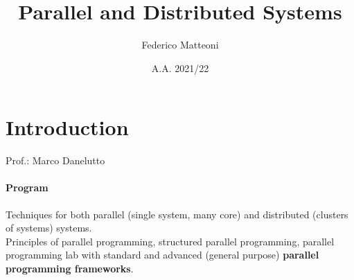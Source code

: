 \documentclass[10pt]{report}
\begin{document}
\title{Parallel and Distributed Systems}
\author{Federico Matteoni}
\date{A.A. 2021/22}
\renewcommand*\contentsname{Index}

\maketitle
\tableofcontents
\pagebreak
\section{Introduction}
Prof.: Marco Danelutto
\paragraph{Program} Techniques for both parallel (single system, many core) and distributed (clusters of systems) systems.\\
Principles of parallel programming, structured parallel programming, parallel programming lab with standard and advanced (general purpose) \textbf{parallel programming frameworks}.
\end{document}
